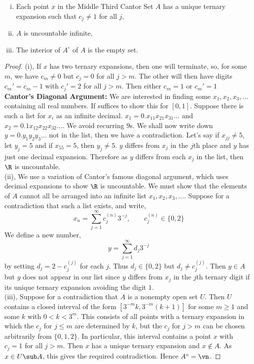 \begin{nprop}
  \leavevmode
  \begin{enumerate}[(i)]
    \item Each point $x$ in the Middle Third Cantor Set $A$ has a unique ternary expansion such that $c_j \ne 1$ for all $j$,
    \item $A$ is uncountable infinite,
    \item The interior of $A^\circ$ of $A$ is the empty set.
  \end{enumerate}
\end{nprop}
\begin{proof}
  (i), If $x$ has two ternary expansions, then one will terminate, so, for some $m$, we have $c_m \ne 0$ but $c_j = 0$ for all $j > m$. The other will then have digits $c_m' = c_m - 1$ with $c_j' = 2$ for all $j > m$. Then either $c_m = 1$ or $c_m' = 1$\\

  \noindent
  \textbf{Cantor's Diagonal Argument:} We are interested in finding some $x_1, x_2, x_3, \dots$ containing all real numbers. If suffices to show this for $[0, 1]$. Suppose there is such a list for $x_i$ as an infinite decimal. $x_1 = 0.x_{11}x_{21}x_{31}\dots$ and $x_2 = 0.1x_{12}x_{22}x_{32}\dots$. We avoid recurring $9$s. We shall now write down $y = 0.y_1y_2y_3\dots$ not in the list, then we have a contradiction. Let's say if $x_{jj} \ne 5$,
  let $y_j = 5$ and if $x_{55} = 5$, then $y_j \ne 5$. $y$ differs from $x_j$ in the $j$th place and $y$ has just one decimal expansion. Therefore as $y$ differs from each $x_j$ in the list, then $\R$ is uncountable.\\

  \noindent
  (ii), We use a variation of Cantor's famous diagonal argument, which uses decimal expansions to show $\R$ is uncountable. We must show that the elements of $A$ cannot all be arranged into an infinite list $x_1, x_2, x_3, \dots$. Suppose for a contradiction that such a list exists, and write,
  $$ x_n = \sum_{j=1}^\infty c_j^{(n)}3^{-j}, \qquad c_j^{(n)} \in \{0, 2\} $$
  We define a new number,
  $$ y = \sum_{j=1}^\infty d_j3^{-j} $$
  by setting $d_j = 2 - c_j^{(j)}$ for each $j$. Thus $d_j \in \{0, 2\}$ but $d_j \ne c_j^{(j)}$. Then $y \in A$ but $y$ does not appear in our list since $y$ differs from $x_j$ in the $j$th ternary digit if its unique ternary expansion avoiding the digit $1$.\\

  \noindent
  (iii), Suppose for a contradiction that $A$ is a nonempty open set $U$. Then $U$ contains a closed interval of the form $[3^{-m}k, 3^{-m}(k+1)]$ for some $m \ge 1$ and some $k$ with $0 < k < 3^m$. This consists of all points with a ternary expansion in which the $c_j$ for $j \le m$ are determined by $k$, but the $c_j$ for $j > m$ can be chosen arbitrarily from $\{0, 1, 2\}$. In particular, this interval contains a point $x$ with $c_j = 1$ for all $j > m$. Then $x$ has a unique ternary expansion and $x \notin A$. As $x \in U \sub A$, this gives the required contradiction. Hence $A^\circ = \vn$.
\end{proof}

